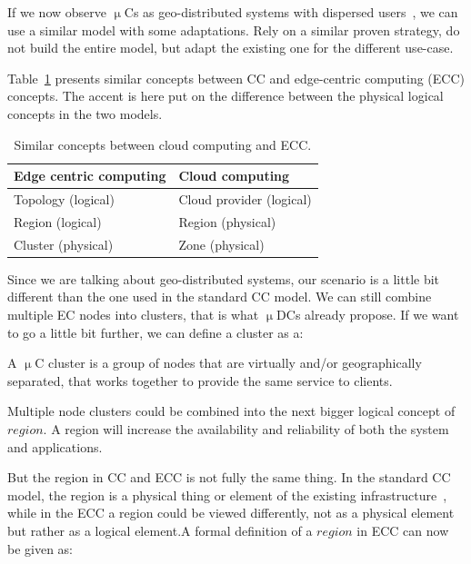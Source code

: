 If we now observe $\upmu$Cs as geo-distributed systems with dispersed users~\cite{hal-01067888}, we can use a similar model with some adaptations. Rely on a similar proven strategy, do not build the entire model, but adapt the existing one for the different use-case.

Table~\ref{tab:table5} presents similar concepts between CC and edge-centric computing (ECC) concepts. The accent is here put on the difference between the physical logical concepts in the two models.

\begin{table}[h!]
	\begin{center}
		\begin{tabular}{l|l}
			\textbf{Edge centric computing} & \textbf{Cloud computing}\\
			\hline
			Topology (logical) & Cloud provider (logical)\\
			Region (logical) & Region (physical)\\
			Cluster (physical) & Zone (physical)\\
		\end{tabular}
	\end{center}
	\vspace{-0.5cm}
	\caption{Similar concepts between cloud computing and ECC.}
	\label{tab:table5}
\end{table}

\noindent
Since we are talking about geo-distributed systems, our scenario is a little bit different than the one used in the standard CC model. We can still combine multiple EC nodes into clusters, that is what $\upmu$DCs already propose. If we want to go a little bit further, we can define a cluster as a:

\begin{definition}
	A $\upmu$C cluster is a group of nodes that are virtually and/or geographically separated, that works together to provide the same service to clients.
\end{definition}

\noindent
Multiple node clusters could be combined into the next bigger logical concept of $region$. A region will increase the availability and reliability of both the system and applications. 

But the region in CC and ECC is not fully the same thing. In the standard CC model, the region is a physical thing or element of the existing infrastructure~\cite{SouzaMFAK19}, while in the ECC a region could be viewed differently, not as a physical element but rather as a logical element.A formal definition of a $region$ in ECC can now be given as:

